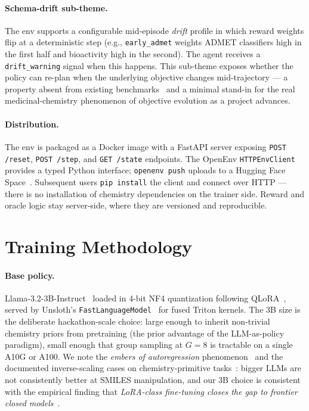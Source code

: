 \documentclass[11pt,a4paper]{article}
\newcommand{\groupSize}{8}                   %
\begin{document}
\paragraph{Schema-drift sub-theme.} The env supports a configurable mid-episode \emph{drift} profile in which reward weights flip at a deterministic step (e.g., \texttt{early\_admet} weights ADMET classifiers high in the first half and bioactivity high in the second). The agent receives a \texttt{drift\_warning} signal when this happens. This sub-theme exposes whether the policy can re-plan when the underlying objective changes mid-trajectory --- a property absent from existing benchmarks~\cite{brown2019guacamol,polykovskiy2020moses} and a minimal stand-in for the real medicinal-chemistry phenomenon of objective evolution as a project advances.

\paragraph{Distribution.} The env is packaged as a Docker image with a FastAPI server exposing \texttt{POST /reset}, \texttt{POST /step}, and \texttt{GET /state} endpoints. The OpenEnv \texttt{HTTPEnvClient} provides a typed Python interface; \texttt{openenv push} uploads to a Hugging Face Space~\cite{huggingface2025openenv}. Subsequent users \texttt{pip install} the client and connect over HTTP --- there is no installation of chemistry dependencies on the trainer side. Reward and oracle logic stay server-side, where they are versioned and reproducible.

\section{Training Methodology}

\paragraph{Base policy.} Llama-3.2-3B-Instruct~\cite{metallama32} loaded in 4-bit NF4 quantization following QLoRA~\cite{dettmers2023qlora}, served by Unsloth's \texttt{FastLanguageModel}~\cite{unsloth2024} for fused Triton kernels. The 3B size is the deliberate hackathon-scale choice: large enough to inherit non-trivial chemistry priors from pretraining (the prior advantage of the LLM-as-policy paradigm), small enough that group sampling at $G=\groupSize$ is tractable on a single A10G or A100. We note the \emph{embers of autoregression} phenomenon~\cite{mccoy2024embers} and the documented inverse-scaling cases on chemistry-primitive tasks~\cite{mckenzie2023inverse}: bigger LLMs are not consistently better at SMILES manipulation, and our 3B choice is consistent with the empirical finding that \emph{LoRA-class fine-tuning closes the gap to frontier closed models}~\cite{yu2024llasmol,cavanagh2024smileyllama}.
\end{document}
